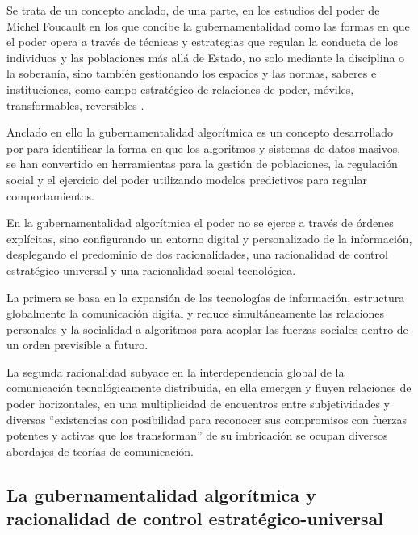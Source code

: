 \documentclass[
  spanish,
  11pt,
  a4paper,
]{scrbook}
\begin{document}
Se trata de un concepto anclado, de una parte, en los estudios del poder
de Michel Foucault en los que concibe la gubernamentalidad como las
formas en que el poder opera a través de técnicas y estrategias que
regulan la conducta de los individuos y las poblaciones más allá de
Estado, no solo mediante la disciplina o la soberanía, sino también
gestionando los espacios y las normas, saberes e instituciones, como
campo estratégico de relaciones de poder, móviles, transformables,
reversibles \autocite[137]{Foucault2006}.

Anclado en ello la gubernamentalidad algorítmica es un concepto
desarrollado por \textcite{Rouvroy2016} para identificar la forma en que
los algoritmos y sistemas de datos masivos, se han convertido en
herramientas para la gestión de poblaciones, la regulación social y el
ejercicio del poder utilizando modelos predictivos para regular
comportamientos.

En la gubernamentalidad algorítmica el poder no se ejerce a través de
órdenes explícitas, sino configurando un entorno digital y personalizado
de la información, desplegando el predominio de dos racionalidades, una
racionalidad de control estratégico-universal y una racionalidad
social-tecnológica.

La primera se basa en la expansión de las tecnologías de información,
estructura globalmente la comunicación digital y reduce simultáneamente
las relaciones personales y la socialidad a algoritmos para acoplar las
fuerzas sociales dentro de un orden previsible a futuro.

La segunda racionalidad subyace en la interdependencia global de la
comunicación tecnológicamente distribuida, en ella emergen y fluyen
relaciones de poder horizontales, en una multiplicidad de encuentros
entre subjetividades y diversas ``existencias con posibilidad para
reconocer sus compromisos con fuerzas potentes y activas que los
transforman'' \autocite[16-17]{Piedrahita2014} de su imbricación se
ocupan diversos abordajes de teorías de comunicación.

\subsection*{La gubernamentalidad algorítmica y racionalidad de control
estratégico-universal}\label{la-gubernamentalidad-algoruxedtmica-y-racionalidad-de-control-estratuxe9gico-universal}
\end{document}

